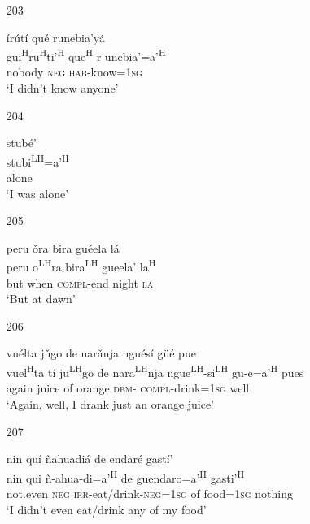 \begin{itemize}
\item[203]
 
\glll   \'{i}r\'{u}t\'{i} qu\'{e} runebia'y\'{a}  \\
gui\textsuperscript{H}ru\textsuperscript{H}ti'\textsuperscript{H} que\textsuperscript{H} r-unebia'=a'\textsuperscript{H}  \\
nobody \textsc{neg} \textsc{hab}-know=\textsc{1sg} \\
\glt `I didn't know anyone'
 


\item[204]
 
\glll  stub\'{e}' \\
stubi\textsuperscript{LH}=a'\textsuperscript{H} \\
alone \\
\glt `I was alone'
 



\item[205]
 
\glll   peru \v{o}ra bira gu\'{e}ela l\'{a}  \\
 peru  o\textsuperscript{LH}ra bira\textsuperscript{LH} gueela' la\textsuperscript{H}  \\
 but when \textsc{compl}-end night \textsc{la} \\
\glt `But at dawn'
 


\item[206]
 
\glll   vu\'{e}lta j\v{u}go de nar\v{a}nja ngu\'{e}s\'{i} g\"{u}\'{e} pue \\
vuel\textsuperscript{H}ta ti ju\textsuperscript{LH}go de nara\textsuperscript{LH}nja ngue\textsuperscript{LH}-si\textsuperscript{LH} gu-e=a'\textsuperscript{H} pues \\
 again juice of orange \textsc{dem}- \textsc{compl}-drink=\textsc{1sg} well \\
\glt `Again, well, I drank just an orange juice'
 


\item[207]

\glll nin qu\'{i} \~{n}ahuadi\'{a} de endar\'{e} gast\'{i}' \\
nin qui \~{n}-ahua-di=a'\textsuperscript{H} de guendaro=a'\textsuperscript{H} gasti'\textsuperscript{H} \\
not.even \textsc{neg} \textsc{irr}-eat/drink-\textsc{neg}=\textsc{1sg} of food=\textsc{1sg} nothing \\
\glt `I didn't even eat/drink any of my food'



\end{itemize}
